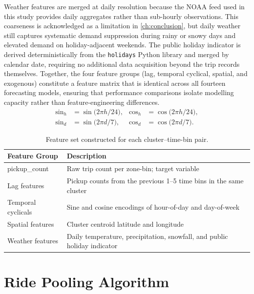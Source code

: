 Weather features are merged at daily resolution because the NOAA feed used in this study provides daily aggregates rather than sub-hourly observations. This coarseness is acknowledged as a limitation in \autoref{ch:conclusion}, but daily weather still captures systematic demand suppression during rainy or snowy days and elevated demand on holiday-adjacent weekends. The public holiday indicator is derived deterministically from the \texttt{holidays} Python library and merged by calendar date, requiring no additional data acquisition beyond the trip records themselves. Together, the four feature groups (lag, temporal cyclical, spatial, and exogenous) constitute a feature matrix that is identical across all fourteen forecasting models, ensuring that performance comparisons isolate modelling capacity rather than feature-engineering differences.
\begin{equation}
 \begin{aligned}
 \sin_h &= \sin\!\bigl(2\pi h/24\bigr), &
 \cos_h &= \cos\!\bigl(2\pi h/24\bigr), \\
 \sin_d &= \sin\!\bigl(2\pi d/7\bigr), &
 \cos_d &= \cos\!\bigl(2\pi d/7\bigr).
 \end{aligned}
 \label{eq:cyclic}
\end{equation}

\begin{table}[t]
\centering
\caption{Feature set constructed for each cluster--time-bin pair.\label{tab:features}}
\begin{tabularx}{\textwidth}{>{\raggedright\arraybackslash}p{3.2cm} >{\raggedright\arraybackslash}X}
\toprule
\textbf{Feature Group} & \textbf{Description} \\
\midrule
pickup\_count & Raw trip count per zone-bin; target variable \\
Lag features & Pickup counts from the previous 1--5 time bins in the same cluster \\
Temporal cyclicals & Sine and cosine encodings of hour-of-day and day-of-week \\
Spatial features & Cluster centroid latitude and longitude \\
Weather features & Daily temperature, precipitation, snowfall, and public holiday indicator \\
\bottomrule
\end{tabularx}
\end{table}

\section{Ride Pooling Algorithm}
\label{sec:pooling}


